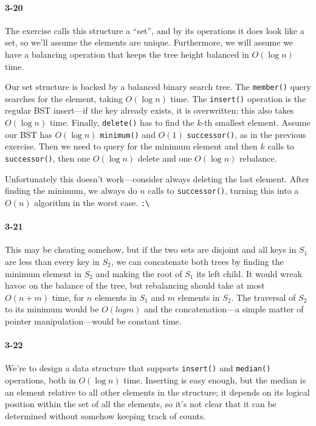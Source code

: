 \documentclass{report}
\begin{document}
\paragraph{3-20} The exercise calls this structure a ``set'', and by its operations it does look like a set, so we'll assume the elements are unique. Furthermore, we will assume we have a balancing operation that keeps the tree height balanced in $O(\log n)$ time.

Our set structure is backed by a balanced binary search tree. The \lstinline!member()! query searches for the element, taking $O(\log n)$ time. The \lstinline!insert()! operation is the regular BST insert---if the key already exists, it is overwritten; this also takes $O(\log n)$ time. Finally, \lstinline!delete()! has to find the $k$-th smallest element. Assume our BST has $O(\log n)$ \lstinline!minimum()! and $O(1)$ \lstinline!successor()!, as in the previous exercise. Then we need to query for the minimum element and then $k$ calls to \lstinline!successor()!, then one $O(\log n)$ delete and one $O(\log n)$ rebalance.

Unfortunately this doesn't work---consider always deleting the last element. After finding the minimum, we always do $n$ calls to \lstinline!successor()!, turning this into a $O(n)$ algorithm in the worst case. \lstinline!:\!

\paragraph{3-21} This may be cheating somehow, but if the two sets are disjoint and all keys in $S_1$ are less than every key in $S_2$, we can concatenate both trees by finding the minimum element in $S_2$ and making the root of $S_1$ its left child. It would wreak havoc on the balance of the tree, but rebalancing should take at most $O(n+m)$ time, for $n$ elements in $S_1$ and $m$ elements in $S_2$. The traversal of $S_2$ to its minimum would be $O(log m)$ and the concatenation---a simple matter of pointer manipulation---would be constant time.

\paragraph{3-22} We're to design a data structure that supports \lstinline!insert()! and \lstinline!median()! operations, both in $O(\log n)$ time. Inserting is easy enough, but the median is an element relative to all other elements in the structure; it depends on its logical position within the set of all the elements, so it's not clear that it can be determined without somehow keeping track of counts.
\end{document}
